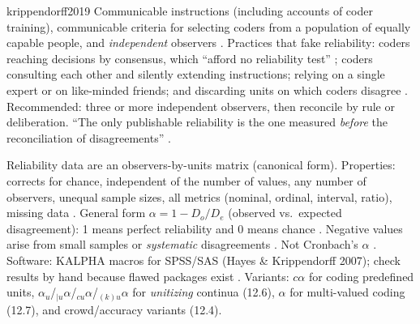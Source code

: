 \begin{papercard}{krippendorff2019}
 Communicable instructions (including accounts of coder training), communicable criteria for selecting coders from a population of equally capable people, and \emph{independent} observers . Practices that fake reliability: coders reaching decisions by consensus, which ``afford no reliability test'' ; coders consulting each other and silently extending instructions; relying on a single expert or on like-minded friends; and discarding units on which coders disagree . Recommended: three or more independent observers, then reconcile by rule or deliberation. ``The only publishable reliability is the one measured \emph{before} the reconciliation of disagreements'' .

 Reliability data are an observers-by-units matrix (canonical form). Properties: corrects for chance, independent of the number of values, any number of observers, unequal sample sizes, all metrics (nominal, ordinal, interval, ratio), missing data . General form $\alpha=1-D_o/D_e$ (observed vs.\ expected disagreement): 1 means perfect reliability and 0 means chance . Negative values arise from small samples or \emph{systematic} disagreements . Not Cronbach's $\alpha$ . Software: KALPHA macros for SPSS/SAS (Hayes \& Krippendorff 2007); check results by hand because flawed packages exist . Variants: $c\alpha$ for coding predefined units, $\alpha_u$/$_{|u}\alpha$/$_{cu}\alpha$/$_{(k)u}\alpha$ for \emph{unitizing} continua (12.6), $\alpha$ for multi-valued coding (12.7), and crowd/accuracy variants (12.4).


\end{papercard}
